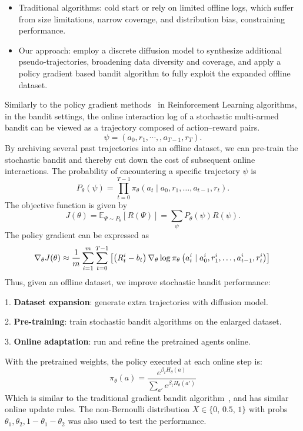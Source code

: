 \begin{itemize}
    \item Traditional algorithms: cold start or rely on limited offline logs, which suffer from size limitations, narrow coverage, and distribution bias, constraining performance.
    \item Our approach: employ a discrete diffusion model to synthesize additional pseudo-trajectories, broadening data diversity and coverage, and apply a policy gradient based bandit algorithm to fully exploit the expanded offline dataset.
\end{itemize}

Similarly to the policy gradient methods~\cite{sutton1999policy} in Reinforcement Learning algorithms, in the bandit settings, the online interaction log of a stochastic multi-armed bandit can be viewed as a trajectory composed of action–reward pairs.
\begin{equation}
\psi=\left(a_0,r_1,\cdots,,a_{T-1},r_T\right).
\end{equation}
By archiving several past trajectories into an offline dataset, we can pre-train the stochastic bandit and thereby cut down the cost of subsequent online interactions. The probability of encountering a specific trajectory $\psi$ is
\begin{equation}
P_{\theta}(\psi)=\prod_{t=0}^{T-1}\pi_{\theta}(a_t \mid a_0, r_1,\ldots, a_{t-1},r_t).
\end{equation}
The objective function is given by
\begin{equation}
J(\theta) = \mathbb{E}_{\Psi\sim P_{\theta}}\left[R(\Psi)\right] = \sum_{\psi}P_{\theta}(\psi)R(\psi).
\end{equation}
The policy gradient can be expressed as
\begin{equation}
\nabla_{\theta}J(\theta) \approx \dfrac{1}{m}\sum_{i=1}^m\sum_{t=0}^{T-1}\left[\left(R_t^i - b_t\right) \nabla_{\theta}\log\pi_{\theta}\left(a_t^i \mid a_0^i, r_1^i,\ldots, a_{t-1}^i,r_t^i\right)\right] \\
\end{equation}
Thus, given an offline dataset, we improve stochastic bandit performance:

1. \textbf{Dataset expansion}: generate extra trajectories with diffusion model.

2. \textbf{Pre-training}: train stochastic bandit algorithms on the enlarged dataset.

3. \textbf{Online adaptation}: run and refine the pretrained agents online.

With the pretrained weights, the policy executed at each online step is:
\begin{equation}
\pi_{\theta}(a)=\dfrac{e^{\beta_tH_{\theta}(a)}}{\sum_{a'} e^{\beta_tH_{\theta}(a')}}
\end{equation}
Which is similar to the traditional gradient bandit algorithm~\cite{gradient_bandit}, and has similar online update rules. 
The non-Bernoulli distribution $X \in \{0,\,0.5,\,1\}$ with probs $\theta_1,\theta_2,1-\theta_1-\theta_2$ was also used to test the performance.